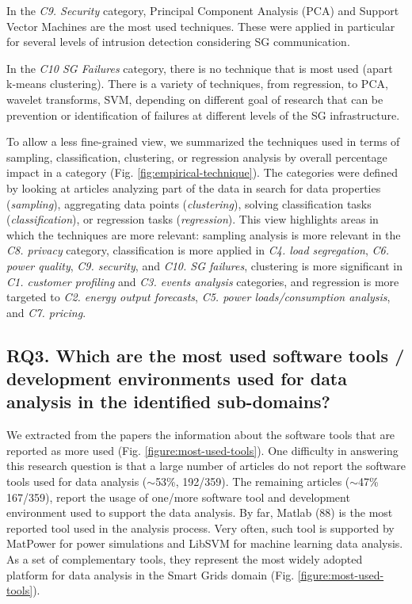 \documentclass[journal]{IEEEtran}
\begin{document}
In the \textit{C9. Security} category, Principal Component Analysis (PCA) and Support Vector Machines are the most used techniques. These were applied in particular for several levels of intrusion detection considering SG communication.

In the \textit{C10 SG Failures} category, there is no technique that is most used (apart k-means clustering). There is a variety of techniques, from regression, to PCA, wavelet transforms, SVM, depending on different goal of research that can be prevention or identification of failures at different levels of the SG infrastructure. 

To allow a less fine-grained view, we summarized the techniques used in terms of sampling, classification, clustering, or regression analysis by overall percentage impact in a category (Fig. \ref{fig:empirical-technique}). The categories were defined by looking at articles analyzing part of the data in search for data properties (\textit{sampling}), aggregating data points (\textit{clustering}), solving classification tasks (\textit{classification}), or regression tasks (\textit{regression}). This view highlights areas in which the techniques are more relevant: sampling analysis is more relevant in the \textit{C8. privacy} category, classification is more applied in \textit{C4. load segregation}, \textit{C6. power quality}, \textit{C9. security}, and \textit{C10. SG failures}, clustering is more significant in \textit{C1. customer profiling} and \textit{C3. events analysis} categories, and regression is more targeted to \textit{C2. energy output forecasts}, \textit{C5. power loads/consumption analysis}, and \textit{C7. pricing}.


\subsection{RQ3. Which are the most used software tools / development environments used for data analysis in the identified sub-domains?}

We extracted from the papers the information about the software tools that are reported as more used (Fig. \ref{figure:most-used-tools}). One difficulty in answering this research question is that a large number of articles do not report the software tools used for data analysis ($\sim$53\%, 192/359). The remaining articles ($\sim$47\% 167/359), report the usage of one/more software tool and development environment used to support the data analysis. By far, Matlab (88) is the most reported tool used in the analysis process. Very often, such tool is supported by MatPower for power simulations and LibSVM for machine learning data analysis. As a set of complementary tools, they represent the most widely adopted platform for data analysis in the Smart Grids domain (Fig. \ref{figure:most-used-tools}). 
\end{document}
